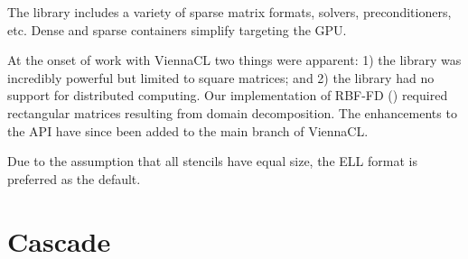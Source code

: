 \documentclass{report}
\begin{document}
The library includes a variety of sparse matrix formats, solvers, preconditioners, etc. Dense and sparse containers simplify targeting the GPU. 

At the onset of work with ViennaCL two things were apparent: 1) the library was incredibly powerful but limited to square matrices; and 2) the library had no support for distributed computing. Our implementation of RBF-FD (\cite{BolligRBFFDGPU}) required rectangular matrices resulting from domain decomposition. The enhancements to the API have since been added to the main branch of ViennaCL. 









Due to the assumption that all stencils have equal size, the ELL format is preferred as the default. 
 

\section{Cascade}
\end{document}
